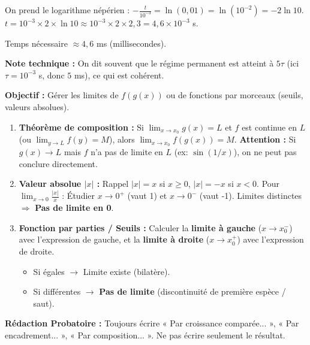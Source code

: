\documentclass[11pt]{article}
\begin{document}
\begin{exoresolu}
\begin{enumerate}
              On prend le logarithme népérien :
              $-\frac{t}{10^{-3}} = \ln(0,01) = \ln(10^{-2}) = -2\ln 10$.
              $t = 10^{-3} \times 2 \times \ln 10 \approx 10^{-3} \times 2 \times 2,3 = 4,6 \times 10^{-3}$ s.
              \begin{aretenir}
                  Temps nécessaire $\approx 4,6$ ms (millisecondes).
              \end{aretenir}
              \textbf{Note technique :} On dit souvent que le régime permanent est atteint à $5\tau$ (ici $\tau = 10^{-3}$ s, donc $5$ ms), ce qui est cohérent.
    \end{enumerate}
\end{exoresolu}

\begin{methode}
    \textbf{Objectif :} Gérer les limites de $f(g(x))$ ou de fonctions par morceaux (seuils, valeurs absolues).
    \begin{enumerate}
        \item \textbf{Théorème de composition :} Si $\lim_{x\to x_0} g(x) = L$ et $f$ est continue en $L$ (ou $\lim_{y\to L} f(y) = M$), alors $\lim_{x\to x_0} f(g(x)) = M$.
              \textbf{Attention :} Si $g(x) \to L$ mais $f$ n'a pas de limite en $L$ (ex: $\sin(1/x)$), on ne peut pas conclure directement.
        \item \textbf{Valeur absolue $|x|$ :} Rappel $|x| = x$ si $x\ge 0$, $|x| = -x$ si $x < 0$.
              Pour $\lim_{x\to 0} \frac{|x|}{x}$ : Étudier $x\to 0^+$ (vaut 1) et $x\to 0^-$ (vaut -1). Limites distinctes $\Rightarrow$ \textbf{Pas de limite en 0}.
        \item \textbf{Fonction par parties / Seuils :} Calculer la \textbf{limite à gauche} ($x\to x_0^-$) avec l'expression de gauche, et la \textbf{limite à droite} ($x\to x_0^+$) avec l'expression de droite.
              \begin{itemize}
                  \item Si égales $\to$ Limite existe (bilatère).
                  \item Si différentes $\to$ \textbf{Pas de limite} (discontinuité de première espèce / saut).
              \end{itemize}
    \end{enumerate}
    \textbf{Rédaction Probatoire :} Toujours écrire « Par croissance comparée... », « Par encadrement... », « Par composition... ». Ne pas écrire seulement le résultat.
\end{methode}
\end{document}
